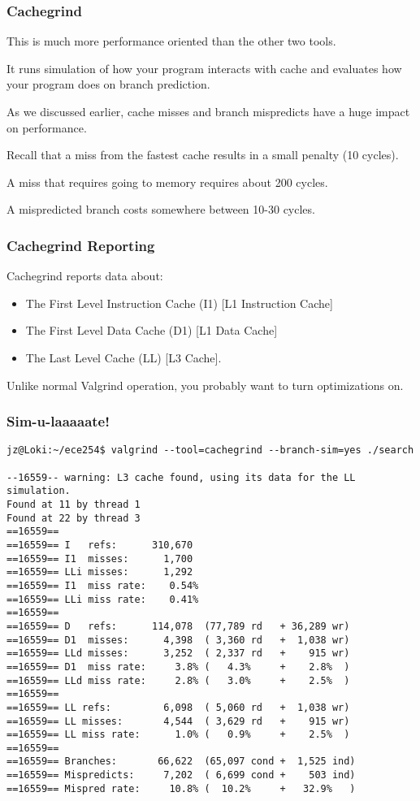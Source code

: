 \begin{frame}
\frametitle{Cachegrind}

This is much more performance oriented than the other two tools. 

 It runs simulation of how your program interacts with cache and evaluates how your program does on branch prediction.
 
 As we discussed earlier, cache misses and branch mispredicts have a huge impact on performance.
 
 Recall that a miss from the fastest cache results in a small penalty (10 cycles).
 
 A miss that requires going to memory requires about 200 cycles. 
 
 A mispredicted branch costs somewhere between 10-30 cycles.


\end{frame}

\begin{frame}
\frametitle{Cachegrind Reporting}

Cachegrind reports data about:
\begin{itemize}
	\item The First Level Instruction Cache (I1) [L1 Instruction Cache]
	\item The First Level Data Cache (D1) [L1 Data Cache]
	\item The Last Level Cache (LL) [L3 Cache].
\end{itemize}

Unlike normal Valgrind operation, you probably want to turn optimizations on.

\end{frame}

\begin{frame}[fragile]
\frametitle{Sim-u-laaaaate!}
{\scriptsize

\begin{verbatim}
jz@Loki:~/ece254$ valgrind --tool=cachegrind --branch-sim=yes ./search

--16559-- warning: L3 cache found, using its data for the LL simulation.
Found at 11 by thread 1 
Found at 22 by thread 3 
==16559== 
==16559== I   refs:      310,670
==16559== I1  misses:      1,700
==16559== LLi misses:      1,292
==16559== I1  miss rate:    0.54%
==16559== LLi miss rate:    0.41%
==16559== 
==16559== D   refs:      114,078  (77,789 rd   + 36,289 wr)
==16559== D1  misses:      4,398  ( 3,360 rd   +  1,038 wr)
==16559== LLd misses:      3,252  ( 2,337 rd   +    915 wr)
==16559== D1  miss rate:     3.8% (   4.3%     +    2.8%  )
==16559== LLd miss rate:     2.8% (   3.0%     +    2.5%  )
==16559== 
==16559== LL refs:         6,098  ( 5,060 rd   +  1,038 wr)
==16559== LL misses:       4,544  ( 3,629 rd   +    915 wr)
==16559== LL miss rate:      1.0% (   0.9%     +    2.5%  )
==16559== 
==16559== Branches:       66,622  (65,097 cond +  1,525 ind)
==16559== Mispredicts:     7,202  ( 6,699 cond +    503 ind)
==16559== Mispred rate:     10.8% (  10.2%     +   32.9%   )

\end{verbatim}
}

\end{frame}

